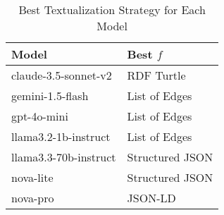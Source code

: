 \begin{table}[ht]
\centering
\caption{Best Textualization Strategy for Each Model}
\begin{tabular}{ll}
\toprule
Model & Best $f$ \\
\midrule
claude-3.5-sonnet-v2 & RDF Turtle \\
gemini-1.5-flash & List of Edges \\
gpt-4o-mini & List of Edges \\
llama3.2-1b-instruct & List of Edges \\
llama3.3-70b-instruct & Structured JSON \\
nova-lite & Structured JSON \\
nova-pro & JSON-LD \\
\bottomrule
\end{tabular}
\end{table}